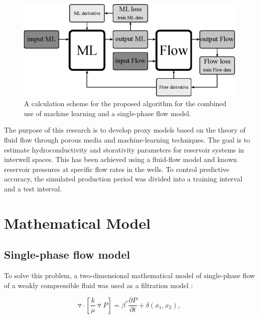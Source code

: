 \documentclass[
11pt,%
tightenlines,%
twoside,%
onecolumn,%
nofloats,%
nobibnotes,%
nofootinbib,%
superscriptaddress,%
noshowpacs,%
centertags]%
{revtex4}
\begin{document}
\begin{figure}
	\centering
	\includegraphics[width=0.7\linewidth]{images/fig1.eps}
	\caption{A calculation scheme for the proposed algorithm for the combined use of machine learning and a single-phase flow model.}
	\label{fig:schime1}
\end{figure}

The purpose of this research is to develop proxy models based on the theory of fluid flow through porous media and machine-learning techniques. The goal is to estimate hydroconductivity and storativity parameters for reservoir systems in interwell spaces. This has been achieved using a fluid-flow model and known reservoir pressures at specific flow rates in the wells. To control predictive accuracy, the simulated production period was divided into a training interval and a test interval.

\section{Mathematical Model}

\subsection{Single-phase flow model}
To solve this problem, a two-dimensional mathematical model of single-phase flow of a
weakly compressible fluid was used as a filtration model \cite{bas}:

\begin{equation} \label{fil}
	\triangledown \cdot \left[\frac{k}{\mu}\triangledown P \right] = \beta^* \frac{\partial P}{\partial t} + \delta(x_1,x_2),
\end{equation}
\end{document}
